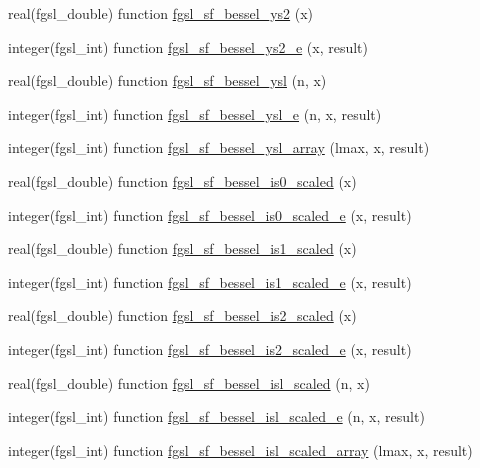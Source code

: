 \begin{DoxyCompactItemize}
\item 
real(fgsl\-\_\-double) function \hyperlink{specfunc_8finc_aa420c0082944ca91380fff36accdca85}{fgsl\-\_\-sf\-\_\-bessel\-\_\-ys2} (x)
\item 
integer(fgsl\-\_\-int) function \hyperlink{specfunc_8finc_a5a4e5351a849979f0d4b854bfe7bcbc9}{fgsl\-\_\-sf\-\_\-bessel\-\_\-ys2\-\_\-e} (x, result)
\item 
real(fgsl\-\_\-double) function \hyperlink{specfunc_8finc_acea044354e5de5f02815d2246cd4661d}{fgsl\-\_\-sf\-\_\-bessel\-\_\-ysl} (n, x)
\item 
integer(fgsl\-\_\-int) function \hyperlink{specfunc_8finc_accca890e7731268378117d252770985f}{fgsl\-\_\-sf\-\_\-bessel\-\_\-ysl\-\_\-e} (n, x, result)
\item 
integer(fgsl\-\_\-int) function \hyperlink{specfunc_8finc_a32a304d26cfd3ed3f115177ca8c4fc00}{fgsl\-\_\-sf\-\_\-bessel\-\_\-ysl\-\_\-array} (lmax, x, result)
\item 
real(fgsl\-\_\-double) function \hyperlink{specfunc_8finc_aefdf46b4b529a2c3c7ff2aea4b9ef39c}{fgsl\-\_\-sf\-\_\-bessel\-\_\-is0\-\_\-scaled} (x)
\item 
integer(fgsl\-\_\-int) function \hyperlink{specfunc_8finc_a5315a6bcb6ea338e48f5d2e456ec6ae5}{fgsl\-\_\-sf\-\_\-bessel\-\_\-is0\-\_\-scaled\-\_\-e} (x, result)
\item 
real(fgsl\-\_\-double) function \hyperlink{specfunc_8finc_a75591023377883b34dd97a83636987e2}{fgsl\-\_\-sf\-\_\-bessel\-\_\-is1\-\_\-scaled} (x)
\item 
integer(fgsl\-\_\-int) function \hyperlink{specfunc_8finc_a6cd23bcdbd5e162709e2105bd6a414f6}{fgsl\-\_\-sf\-\_\-bessel\-\_\-is1\-\_\-scaled\-\_\-e} (x, result)
\item 
real(fgsl\-\_\-double) function \hyperlink{specfunc_8finc_a310d2b10adf86bea7021155aac2cd80c}{fgsl\-\_\-sf\-\_\-bessel\-\_\-is2\-\_\-scaled} (x)
\item 
integer(fgsl\-\_\-int) function \hyperlink{specfunc_8finc_afcc428b9c5d6acc160b6b0fc6d66f795}{fgsl\-\_\-sf\-\_\-bessel\-\_\-is2\-\_\-scaled\-\_\-e} (x, result)
\item 
real(fgsl\-\_\-double) function \hyperlink{specfunc_8finc_a60d2720c3bf8d9771830e29a7899a67c}{fgsl\-\_\-sf\-\_\-bessel\-\_\-isl\-\_\-scaled} (n, x)
\item 
integer(fgsl\-\_\-int) function \hyperlink{specfunc_8finc_a4fe4e94f17df4a2711bcfe8c6f4d9bd9}{fgsl\-\_\-sf\-\_\-bessel\-\_\-isl\-\_\-scaled\-\_\-e} (n, x, result)
\item 
integer(fgsl\-\_\-int) function \hyperlink{specfunc_8finc_af82f9a0bceb2a20163ad54dff5c36239}{fgsl\-\_\-sf\-\_\-bessel\-\_\-isl\-\_\-scaled\-\_\-array} (lmax, x, result)

\end{DoxyCompactItemize}
